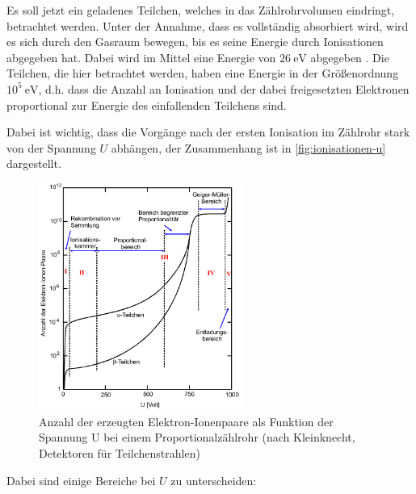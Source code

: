 Es soll jetzt ein geladenes Teilchen, welches in das Zählrohrvolumen eindringt, betrachtet werden. Unter
der Annahme, dass es vollständig absorbiert wird, wird es sich durch den Gasraum bewegen, bis es seine 
Energie durch Ionisationen abgegeben hat. Dabei wird im Mittel eine Energie von $26\ \si{\eV}$ 
abgegeben \cite{detektoren}.
Die Teilchen, die hier betrachtet werden, haben eine Energie in der Größenordnung $10^5\ \si{\eV}$, d.h. 
dass die Anzahl an Ionisation und der dabei freigesetzten Elektronen proportional zur Energie des 
einfallenden Teilchens sind.

\noindent
Dabei ist wichtig, dass die Vorgänge nach der ersten Ionisation im Zählrohr stark von der Spannung $U$ 
abhängen, der Zusammenhang ist in \autoref{fig:ionisationen-u} dargestellt.
\begin{figure}[H]
	\centering
	\includegraphics[width=0.6\textwidth]{content/ionisationen-u.png}
	\caption{Anzahl der erzeugten Elektron-Ionenpaare als Funktion der Spannung U bei einem
	Proportionalzählrohr (nach Kleinknecht, Detektoren für Teilchenstrahlen) \cite{sample}}
	\label{fig:ionisationen-u}
\end{figure}
Dabei sind einige Bereiche bei $U$ zu unterscheiden:
